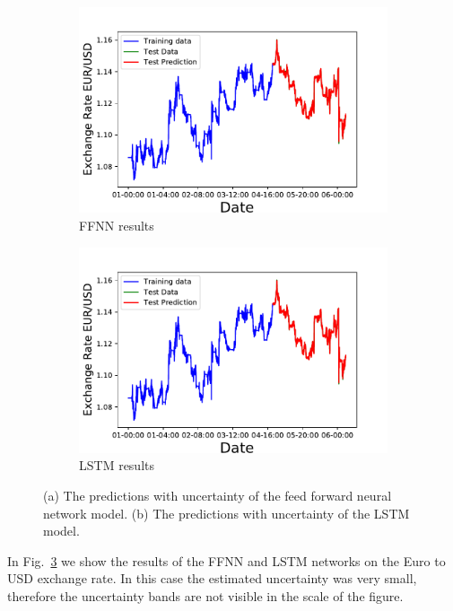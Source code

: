 \documentclass[10pt,a4paper]{article}
\begin{document}
\newpage
\begin{figure}[h]
\centering
\begin{subfigure}{.5\textwidth}
  \centering
  \includegraphics[scale=0.41]{EURO_USD_exchange_rate_NN.pdf}
  \caption{FFNN results}
  \label{fig:NN results EURO_USD}
\end{subfigure}%
\begin{subfigure}{.5\textwidth}
  \centering
  \includegraphics[scale=0.41]{EURO_USD_exchange_rate_LSTN.pdf}
  \caption{LSTM results}
  \label{fig:LSTM results EURO_USD}
\end{subfigure}
\caption{(a) The predictions with uncertainty of the feed forward neural network model. (b) The predictions with uncertainty of the LSTM model.}
\label{fig:results EURO_USD}
\end{figure}
In Fig.~\ref{fig:results EURO_USD} we show the results of the FFNN and LSTM networks on the Euro to USD exchange rate. In this case the estimated uncertainty was very small, therefore the uncertainty bands are not visible in the scale of the figure.
\end{document}
